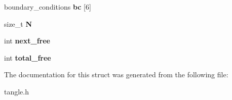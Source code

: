 \begin{DoxyCompactItemize}
\item 
boundary\+\_\+conditions {\bfseries bc} \mbox{[}6\mbox{]}\hypertarget{structtangle__state_a9a01ad622d11ba33b04561ae2a6796a3}{}\label{structtangle__state_a9a01ad622d11ba33b04561ae2a6796a3}

\item 
size\+\_\+t {\bfseries N}\hypertarget{structtangle__state_ad238db7a3d13f520bd186ad6b02b0c61}{}\label{structtangle__state_ad238db7a3d13f520bd186ad6b02b0c61}

\item 
int {\bfseries next\+\_\+free}\hypertarget{structtangle__state_a9fffc094aab6d2fd87117821020801c8}{}\label{structtangle__state_a9fffc094aab6d2fd87117821020801c8}

\item 
int {\bfseries total\+\_\+free}\hypertarget{structtangle__state_acb49908248cf8536c6a553680a10a824}{}\label{structtangle__state_acb49908248cf8536c6a553680a10a824}

\end{DoxyCompactItemize}


The documentation for this struct was generated from the following file\+:\begin{DoxyCompactItemize}
\item 
tangle.\+h\end{DoxyCompactItemize}

